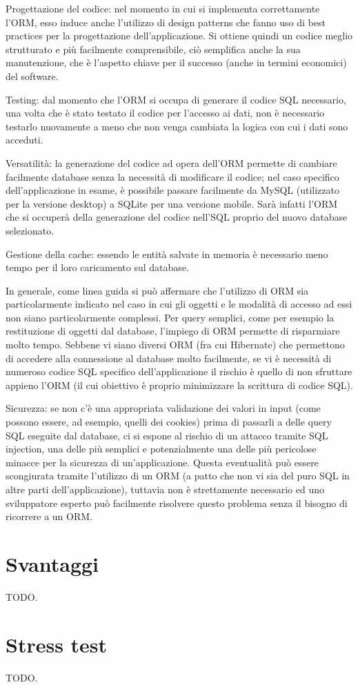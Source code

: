 Progettazione del codice: nel momento in cui si implementa correttamente l'ORM, esso induce anche l'utilizzo di design patterns che fanno uso di best practices per la progettazione dell'applicazione. Si ottiene quindi un codice meglio strutturato e più facilmente comprensibile, ciò semplifica anche la sua manutenzione, che è l'aspetto chiave per il successo (anche in termini economici) del software.

Testing: dal momento che l'ORM si occupa di generare il codice SQL necessario, una volta che è stato testato il codice per l'accesso ai dati, non è necessario testarlo nuovamente a meno che non venga cambiata la logica con cui i dati sono acceduti. 

Versatilità: la generazione del codice ad opera dell'ORM permette di cambiare facilmente database senza la necessità di modificare il codice; nel caso specifico dell'applicazione in esame, è possibile passare facilmente da MySQL (utilizzato per la versione desktop) a SQLite per una versione mobile. Sarà infatti l'ORM che si occuperà della generazione del codice nell'SQL proprio del nuovo database selezionato.

Gestione della cache: essendo le entità salvate in memoria è necessario meno tempo per il loro caricamento sul database.

In generale, come linea guida si può affermare che l'utilizzo di ORM sia particolarmente indicato nel caso in cui gli oggetti e le modalità di accesso ad essi non siano particolarmente complessi. Per query semplici, come per esempio la restituzione di oggetti dal database, l'impiego di ORM permette di risparmiare molto tempo. Sebbene vi siano diversi ORM (fra cui Hibernate) che permettono di accedere alla connessione al database molto facilmente, se vi è necessità di numeroso codice SQL specifico dell'applicazione il rischio è quello di non sfruttare appieno l'ORM (il cui obiettivo è proprio minimizzare la scrittura di codice SQL).

Sicurezza: se non c'è una appropriata validazione dei valori in input (come possono essere, ad esempio, quelli dei cookies) prima di passarli a delle query SQL eseguite dal database, ci si espone al rischio di un attacco tramite SQL injection, una delle più semplici e potenzialmente una delle più pericolose minacce per la sicurezza di un'applicazione. Questa eventualità può essere scongiurata tramite l'utilizzo di un ORM (a patto che non vi sia del puro SQL in altre parti dell'applicazione), tuttavia non è strettamente necessario ed uno sviluppatore esperto può facilmente risolvere questo problema senza il bisogno di ricorrere a un ORM.

\section{Svantaggi}

TODO.

\section{Stress test}

TODO.